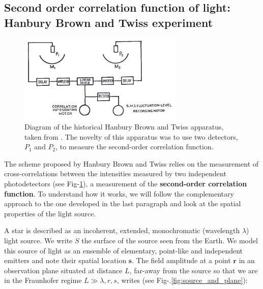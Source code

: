 


\subsection{Second order correlation function of light: Hanbury Brown and Twiss experiment}

\begin{figure}
    \centering
    \includegraphics[width=0.7\textwidth]{Fig/Chapter1/HBT_apparatus.png}
    \caption[Diagram of the historical Hanbury Brown and Twiss apparatus]{Diagram of the historical Hanbury Brown and Twiss apparatus, taken from \cite{brown1956test}. The novelty of this apparatus was to use two detectors, $P_1$ and $P_2$, to measure the second-order correlation function.}
    \label{fig:HBT_apparatus}
\end{figure}

\label{sec:hbt_classical}

The scheme proposed by Hanbury Brown and Twiss relies on the measurement of cross-correlations between the intensities measured by two independent photodetectors (see Fig-\ref{fig:HBT_apparatus}), \ie a measurement of the \textbf{second-order correlation function}. To understand how it works, we will follow the complementary approach to the one developed in the last paragraph and look at the spatial properties of the light source. 

A star is described as an incoherent, extended, monochromatic (wavelength $\lambda$) light source. We write $S$ the surface of the source seen from the Earth. We model this source of light as an ensemble of elementary, point-like and independent emitters and note their spatial location $\bm{s}$. The field amplitude at a point $\bm{r}$ in an observation plane situated at distance $L$, far-away from the source so that we are in the Fraunhofer regime $L \gg \lambda, r,s$, writes (see Fig-.\ref{fig:source_and_plane}):

